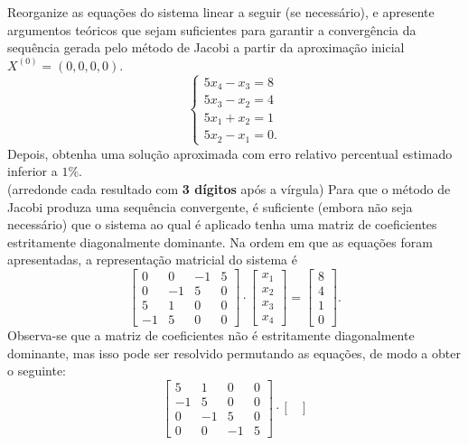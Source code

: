 \documentclass[12pt,a4paper]{article}
\begin{document}
\begin{ExerciseList}
\Exercise[title={2,5}]
Reorganize as equações do sistema linear a seguir (se necessário), e apresente argumentos teóricos que sejam suficientes para garantir a convergência da sequência gerada pelo método de Jacobi a partir da aproximação inicial $X^{(0)} = (0, 0, 0, 0)$.
\[
\begin{cases}
5x_4-x_3 = 8\\
5x_3-x_2 = 4\\
5x_1+x_2 = 1\\
5x_2-x_1 = 0.
\end{cases}
\]
Depois, obtenha uma solução aproximada com erro relativo percentual estimado inferior a $1\%$.\\
(arredonde cada resultado com \textbf{3 dígitos} após a vírgula)
\Answer
Para que o método de Jacobi produza uma sequência convergente, é suficiente (embora não seja necessário) que o sistema ao qual é aplicado tenha uma matriz de coeficientes estritamente diagonalmente dominante. Na ordem em que as equações foram apresentadas, a representação matricial do sistema é
\[
\begin{bmatrix}
0 & 0 & -1 & 5 \\
0 & -1 & 5 & 0 \\
5 & 1 & 0 & 0 \\
-1 & 5 & 0 & 0
\end{bmatrix}
\cdot
\begin{bmatrix}
x_1 \\ x_2 \\ x_3 \\ x_4
\end{bmatrix}
=
\begin{bmatrix}
8 \\ 4 \\ 1 \\ 0
\end{bmatrix}.
\]
Observa-se que a matriz de coeficientes não é estritamente diagonalmente dominante, mas isso pode ser resolvido permutando as equações, de modo a obter o seguinte:
\[
\begin{bmatrix}
5 & 1 & 0 & 0 \\
-1 & 5 & 0 & 0 \\
0 & -1 & 5 & 0 \\
0 & 0 & -1 & 5
\end{bmatrix}
\cdot
\begin{bmatrix}

\end{bmatrix}\]
\end{ExerciseList}
\end{document}

